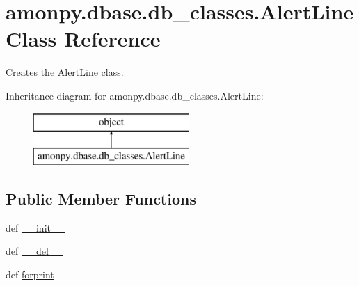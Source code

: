 \hypertarget{classamonpy_1_1dbase_1_1db__classes_1_1_alert_line}{\section{amonpy.\-dbase.\-db\-\_\-classes.\-Alert\-Line Class Reference}
\label{classamonpy_1_1dbase_1_1db__classes_1_1_alert_line}
}


Creates the \hyperlink{classamonpy_1_1dbase_1_1db__classes_1_1_alert_line}{Alert\-Line} class.  


Inheritance diagram for amonpy.\-dbase.\-db\-\_\-classes.\-Alert\-Line\-:\begin{figure}[H]
\begin{center}
\leavevmode
\includegraphics[height=2.000000cm]{d5/d8e/classamonpy_1_1dbase_1_1db__classes_1_1_alert_line}
\end{center}
\end{figure}
\subsection*{Public Member Functions}
\begin{DoxyCompactItemize}
\item 
def \hyperlink{classamonpy_1_1dbase_1_1db__classes_1_1_alert_line_aef4fa3d64975b679df843c3b1cbcfb8e}{\-\_\-\-\_\-init\-\_\-\-\_\-}
\item 
def \hyperlink{classamonpy_1_1dbase_1_1db__classes_1_1_alert_line_a835e26d237c6fa3c78cddc18b2b8d9ff}{\-\_\-\-\_\-del\-\_\-\-\_\-}
\item 
def \hyperlink{classamonpy_1_1dbase_1_1db__classes_1_1_alert_line_a3ab6ec496d54160c4069f47237776646}{forprint}
\end{DoxyCompactItemize}
